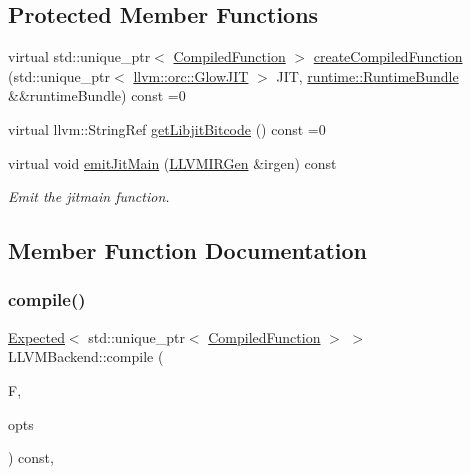 \subsection*{Protected Member Functions}
\begin{DoxyCompactItemize}
\item 
virtual std\+::unique\+\_\+ptr$<$ \hyperlink{classglow_1_1_compiled_function}{Compiled\+Function} $>$ \hyperlink{classglow_1_1_l_l_v_m_backend_a521d4ed1c118a5a0e5a2e81e4688842e}{create\+Compiled\+Function} (std\+::unique\+\_\+ptr$<$ \hyperlink{classllvm_1_1orc_1_1_glow_j_i_t}{llvm\+::orc\+::\+Glow\+J\+IT} $>$ J\+IT, \hyperlink{classglow_1_1runtime_1_1_runtime_bundle}{runtime\+::\+Runtime\+Bundle} \&\&runtime\+Bundle) const =0
\item 
virtual llvm\+::\+String\+Ref \hyperlink{classglow_1_1_l_l_v_m_backend_ade0971b143febc5d795ace2fe95edcc1}{get\+Libjit\+Bitcode} () const =0
\item 
virtual void \hyperlink{classglow_1_1_l_l_v_m_backend_a7bb1a7a95ce1fc155e80f4f48147fd35}{emit\+Jit\+Main} (\hyperlink{classglow_1_1_l_l_v_m_i_r_gen}{L\+L\+V\+M\+I\+R\+Gen} \&irgen) const
\begin{DoxyCompactList}\small\item\em Emit the jitmain function. \end{DoxyCompactList}\end{DoxyCompactItemize}


\subsection{Member Function Documentation}
\mbox{\label{classglow_1_1_l_l_v_m_backend_a914fa04325ef3ba9d345f507795ba3f2}} 
\subsubsection{\texorpdfstring{compile()}{compile()}}
{\footnotesize\ttfamily \hyperlink{classglow_1_1detail_1_1_glow_expected}{Expected}$<$ std\+::unique\+\_\+ptr$<$ \hyperlink{classglow_1_1_compiled_function}{Compiled\+Function} $>$ $>$ L\+L\+V\+M\+Backend\+::compile (\begin{DoxyParamCaption}\item[{\hyperlink{classglow_1_1_function}{Function} $\ast$}]{F,  }\item[{const \hyperlink{structglow_1_1_backend_options}{Backend\+Options} \&}]{opts }\end{DoxyParamCaption}) const\hspace{0.3cm}{\ttfamily [override]}, {\ttfamily [virtual]}}



